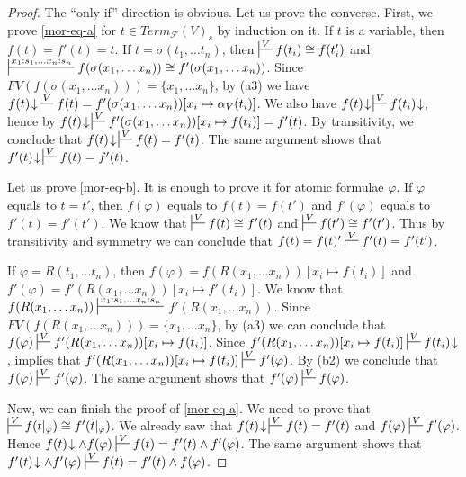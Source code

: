 \documentclass{amsart}
\theoremstyle{definition}
\theoremstyle{remark}
\numberwithin{figure}{section}
\begin{document}
\begin{proof}
The ``only if'' direction is obvious.
Let us prove the converse.
First, we prove \eqref{mor-eq-a} for $t \in Term_\mathcal{F}(V)_s$ by induction on it.
If $t$ is a variable, then $f(t) = f'(t) = t$.
If $t = \sigma(t_1, \ldots t_n)$, then $\sststile{}{V} f(t_i) \cong f(t'_i)$
and $\sststile{}{x_1 : s_1, \ldots x_n : s_n} f(\sigma(x_1, \ldots x_n)) \cong f'(\sigma(x_1, \ldots x_n))$.
Since $FV(f(\sigma(x_1, \ldots x_n))) = \{ x_1, \ldots x_n\}$, by (a3) we have
$f(t)\!\downarrow\,\sststile{}{V} f(t) = f'(\sigma(x_1, \ldots x_n))[x_i \mapsto \alpha_V(t_i)]$.
We also have $f(t)\!\downarrow\,\sststile{}{V} f(t_i)\!\downarrow$, hence by 
$f(t)\!\downarrow\,\sststile{}{V} f'(\sigma(x_1, \ldots x_n))[x_i \mapsto f(t_i)] = f'(t)$.
By transitivity, we conclude that $f(t)\!\downarrow\,\sststile{}{V} f(t) = f'(t)$.
The same argument shows that $f'(t)\!\downarrow\,\sststile{}{V} f(t) = f'(t)$.

Let us prove \eqref{mor-eq-b}.
It is enough to prove it for atomic formulae $\varphi$.
If $\varphi$ equals to $t = t'$, then $f(\varphi)$ equals to $f(t) = f(t')$ and $f'(\varphi)$ equals to $f'(t) = f'(t')$.
We know that $\sststile{}{V} f(t) \cong f'(t)$ and $\sststile{}{V} f(t') \cong f'(t')$.
Thus by transitivity and symmetry we can conclude that $f(t) = f(t)' \sststile{}{V} f'(t) = f'(t')$.

If $\varphi = R(t_1, \ldots t_n)$, then $f(\varphi) = f(R(x_1, \ldots x_n))[x_i \mapsto f(t_i)]$
and $f'(\varphi) = f'(R(x_1, \ldots x_n))[x_i \mapsto f'(t_i)]$.
We know that $f(R(x_1, \ldots x_n)) \sststile{}{x_1 : s_1, \ldots x_n : s_n}$ \linebreak $f'(R(x_1, \ldots x_n))$.
Since $FV(f(R(x_1, \ldots x_n))) = \{ x_1, \ldots x_n \}$, by (a3) we can conclude that $f(\varphi) \sststile{}{V} f'(R(x_1, \ldots x_n))[x_i \mapsto f(t_i)]$.
Since $f'(R(x_1, \ldots x_n))[x_i \mapsto f(t_i)] \sststile{}{V} f(t_i)\!\downarrow$,  implies that
$f'(R(x_1, \ldots x_n))[x_i \mapsto f(t_i)] \sststile{}{V} f'(\varphi)$.
By (b2) we conclude that $f(\varphi) \sststile{}{V} f'(\varphi)$.
The same argument shows that $f'(\varphi) \sststile{}{V} f(\varphi)$.

Now, we can finish the proof of \eqref{mor-eq-a}.
We need to prove that $\sststile{}{V} f(t|_\varphi) \cong f'(t|_\varphi)$.
We already saw that $f(t)\!\downarrow\,\sststile{}{V} f(t) = f'(t)$ and $f(\varphi) \sststile{}{V} f'(\varphi)$.
Hence $f(t)\!\downarrow \land f(\varphi) \sststile{}{V} f(t) = f'(t) \land f'(\varphi)$.
The same argument shows that $f'(t)\!\downarrow \land f'(\varphi) \sststile{}{V} f(t) = f'(t) \land f(\varphi)$.
\end{proof}
\end{document}
